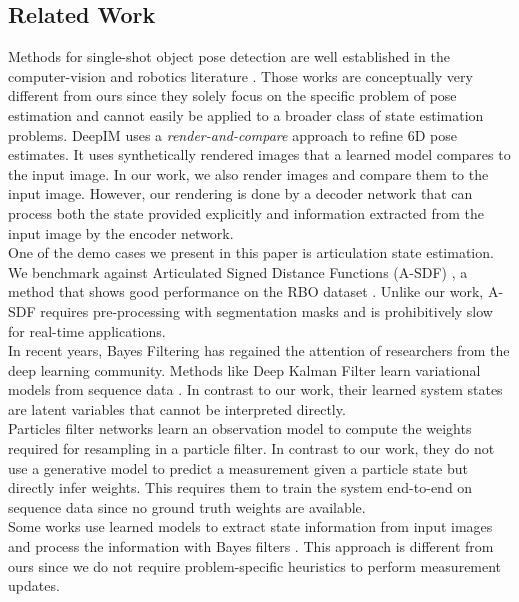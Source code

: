 \documentclass[letterpaper, 10 pt, journal, twoside]{ieeetran}  %
\begin{document}
\subsection{Related Work}
Methods for single-shot object pose detection are well established in the computer-vision and robotics literature \cite{xiang2017posecnn, zakharovDPOD6DPose2019a}. Those works are conceptually very different from ours since they solely focus on the specific problem of pose estimation and cannot easily be applied to a broader class of state estimation problems.
DeepIM \cite{liDeepIMDeepIterative2020} uses a \textit{render-and-compare} approach to refine 6D pose estimates. It uses synthetically rendered images that a learned model compares to the input image. In our work, we also render images and compare them to the input image. However, our rendering is done by a decoder network that can process both the state provided explicitly and information extracted from the input image by the encoder network.\\
One of the demo cases we present in this paper is articulation state estimation. We benchmark against Articulated Signed Distance Functions (A-SDF) \cite{mu2021sdf}, a method that shows good performance on the RBO dataset \cite{rbo2019}. Unlike our work, A-SDF requires pre-processing with segmentation masks and is prohibitively slow for real-time applications.\\
In recent years, Bayes Filtering has regained the attention of researchers from the deep learning community.
Methods like Deep Kalman Filter learn variational models from sequence data \cite{krishnanDeepKalmanFilters2015, beckerRecurrentKalmanNetworks2019, DBLP:conf/iclr/KarlSBS17}. In contrast to our work, their learned system states are latent variables that cannot be interpreted directly. \\
Particles filter networks \cite{karkusParticleFilterNetworks2018a} learn an observation model to compute the weights required for resampling in a particle filter. In contrast to our work, they do not use a generative model to predict a measurement given a particle state but directly infer weights.
This requires them to train the system end-to-end on sequence data since no ground truth weights are available.\\
Some works use learned models to extract state information from input images and process the information with Bayes filters \cite{avantRigidBodyDynamics2020}. This approach is different from ours since we do not require problem-specific heuristics to perform measurement updates.
\end{document}
